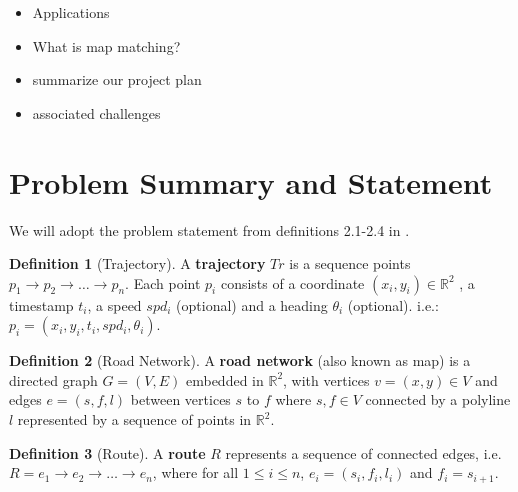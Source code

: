 \documentclass{article}
\numberwithin{equation}{section}
\theoremstyle{definition}
\newtheorem{definition}{Definition}[section]
\newtheorem{remark}[remark]{Remark}
\begin{document}
\begin{itemize}
    \item Applications
    \item What is map matching?
    \item summarize our project plan
\item associated challenges 
\end{itemize}


\section{Problem Summary and Statement}


We will adopt the problem statement from definitions 2.1-2.4 in \cite{C}. 

\begin{definition}[Trajectory]
A \textbf{trajectory} $Tr$ is a sequence points $p_1\rightarrow p_2 \rightarrow \dots \rightarrow p_n$. Each point $p_i$ consists of a coordinate $( x_i,y_i)\in \mathbb{R}^2$ , a timestamp $t_i$, a speed $spd_i$ (optional) and a heading $\theta_i$ (optional). i.e.:  $p_i=( x_i,y_i,t_i,spd_i,\theta_i )$.
\end{definition}

\begin{definition}[Road Network]
A  \textbf{road network} (also known as map) is a directed graph $G=(V,E)$ embedded in $\mathbb{R}^2$, with vertices $v=(x,y)\in V$ and edges $e = (s, f, l)$  between vertices $s$ to $f$  where $s,f\in V$ connected by a polyline $l$ represented by a sequence of points in $\mathbb{R}^2$. %


\end{definition}

\begin{definition}[Route]
A  \textbf{route} $R$ represents a sequence of connected edges, i.e. $R = e_1\rightarrow e_2 \rightarrow \dots \rightarrow e_n$, {\color{blue} where for all $1\leq i\leq n$, $e_i=(s_i,f_i,l_i)$ and $f_i =s_{i+1}$.}%
\end{definition}
\end{document}
